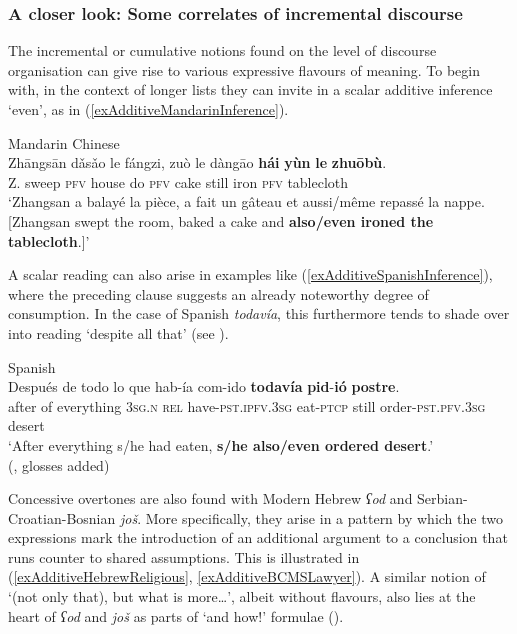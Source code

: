 \subsubsection{A closer look: Some correlates of incremental discourse} The incremental or cumulative notions found on the level of discourse organisation can give rise to various expressive flavours of meaning. To begin with, in the context of longer lists they can invite in a scalar additive inference \lq even\rq{}, as in (\ref{exAdditiveMandarinInference}).

\begin{exe}
	\ex Mandarin Chinese\label{exAdditiveMandarinInference}\\
	\gll Zhāngsān dǎsǎo le fángzi, zuò le dàngāo \textbf{hái} \textbf{yùn} \textbf{le} \textbf{zhuōbù}.\\
	Z. sweep \textsc{pfv} house do \textsc{pfv} cake still iron \textsc{pfv} tablecloth\\
	\glt \lq Zhangsan a balayé la pièce, a fait un gâteau et aussi/même repassé la nappe. [Zhangsan swept the room, baked a cake and \textbf{also/even ironed the tablecloth}.]\rq{ }\parencite[113]{Donazzan2008}
\end{exe}

A scalar reading can also arise in examples like (\ref{exAdditiveSpanishInference}), where the preceding clause suggests an already noteworthy degree of consumption. In the case of Spanish \textit{todavía}, this furthermore tends to shade over into  reading \lq despite all that\rq{ }(see ).
	
\begin{exe}	
	\ex Spanish\label{exAdditiveSpanishInference}\\
	\gll Después de todo lo que hab-ía com-ido \textbf{todavía} \textbf{pid}-\textbf{ió} \textbf{postre}.\\
	after of everything 3\textsc{sg}.\textsc{n} \textsc{rel} have-\textsc{pst}.\textsc{ipfv}.3\textsc{sg} eat-\textsc{ptcp} still order-\textsc{pst}.\textsc{pfv}.3\textsc{sg} desert\\
	\glt \lq After everything s/he had eaten, \textbf{s/he also/even ordered desert}.\rq{}
	\\(\cite[26]{Garrido1993}, glosses added)
\end{exe}

Concessive overtones are also found with Modern Hebrew \textit{ʕod} and Serbian-Croatian-Bosnian \textit{još}. More specifically, they arise in a pattern by which the two expressions mark the introduction of an additional argument to a conclusion that runs counter to shared assumptions. This is illustrated in (\ref{exAdditiveHebrewReligious}, \ref{exAdditiveBCMSLawyer}). A similar notion of \lq (not only that), but what is more…\rq{}, albeit without  flavours, also lies at the heart of \textit{ʕod} and \textit{još} as parts of \lq and how!\rq{ }formulae ().

